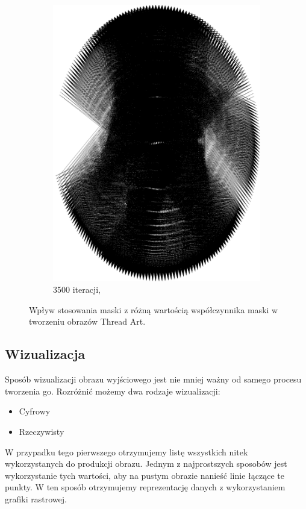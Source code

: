 \begin{figure}[htb]
\begin{subfigure}{0.19\textwidth}
            \includegraphics[width = \textwidth]{img/2-theory/aldrin/100mask-aldrin_ellipse_3500_threaded.png}
            \caption{3500 iteracji, }
            \label{theory-technics-mask-aldrin-threaded-t}
        \end{subfigure}
        \caption{Wpływ stosowania maski z różną wartością współczynnika maski w tworzeniu obrazów Thread Art.}
        \label{theory-technics-mask-aldrin-threaded}
        \end{figure}
        
        \subsection{Wizualizacja}  \label{theory-technics-vis}
        Sposób wizualizacji obrazu wyjściowego jest nie mniej ważny od samego procesu tworzenia go. Rozróżnić możemy dwa rodzaje wizualizacji:
        \begin{itemize}
            \item Cyfrowy
            \item Rzeczywisty
        \end{itemize}
        W przypadku tego pierwszego otrzymujemy listę wszystkich nitek wykorzystanych do produkcji obrazu. Jednym z najprostszych sposobów jest wykorzystanie tych wartości, aby na pustym obrazie nanieść linie łączące te punkty. W ten sposób otrzymujemy reprezentację danych z wykorzystaniem grafiki rastrowej.
        
